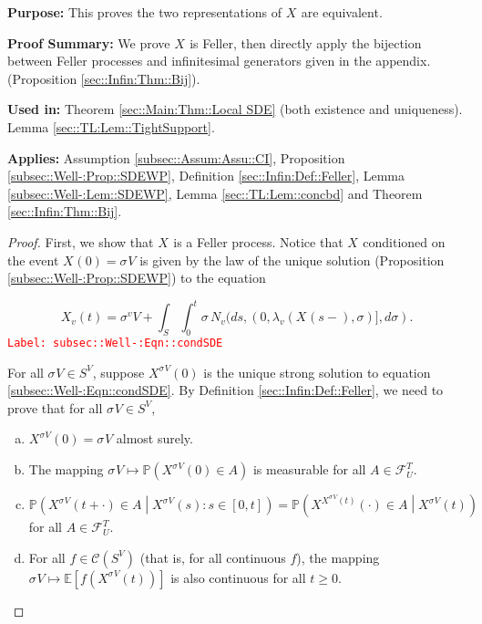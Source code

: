 \documentclass[12pt]{article}
\newcommand{\mb}{\mathbb}
\newcommand{\mc}{\mathcal}
\newcommand{\tr}{\textcolor{red}}
\newcommand{\labe}[1]{\tr{\texttt{Label: #1}}}
\newcommand{\purpose}{\textbf{Purpose: }}
\newcommand{\pfsum}{\textbf{Proof Summary: }}
\newcommand{\usein}{\textbf{Used in: }}
\newcommand{\app}{\textbf{Applies: }}
\newcommand{\pr}{\mb{P}}							%
\newcommand{\ex}[1]{\mb{E}\left[#1\right]}			%
\renewcommand{\v}{v}							%
\renewcommand{\U}{U}							%
\renewcommand{\S}{S}							%
\newcommand{\s}{\sigma}							%
\newcommand{\sv}[1]{\s^{#1}}					%
\newcommand{\T}{T}								%
\renewcommand{\t}{t}							%
\newcommand{\poiss}[1]{N_{#1}}						%
\newcommand{\V}{V}									%
\renewcommand{\tt}{s}								%
\newcommand{\XState}[1]{\S^{#1}}				%
\newcommand{\rxvt}[2]{X_{#1}{(#2)}}					%
\newcommand{\rxvtn}[3]{X_{#1}^{#3}(#2)}				%
\newcommand{\rxvts}[2]{X_{#1}{#2}}					%
\newcommand{\rate}[1]{\lambda_{#1}}					%
\newcommand{\F}[2]{\mc{F}_{#1}^{#2}}				%
\newcommand{\cont}{\mc{C}}							%
\begin{document}
\purpose This proves the two representations of \(\rxvts{}{}\) are equivalent.

\pfsum We prove \(\rxvts{}{}\) is Feller, then directly apply the bijection between Feller processes and infinitesimal generators given in the appendix. (Proposition \ref{sec::Infin:Thm::Bij}).

\usein Theorem \ref{sec::Main:Thm::Local SDE} (both existence and uniqueness). Lemma \ref{sec::TL:Lem::TightSupport}.

\app Assumption \ref{subsec::Assum:Assu::CI}, Proposition \ref{subsec::Well-:Prop::SDEWP}, Definition \ref{sec::Infin:Def::Feller}, Lemma \ref{subsec::Well-:Lem::SDEWP}, Lemma \ref{sec::TL:Lem::concbd} and Theorem \ref{sec::Infin:Thm::Bij}.

\begin{proof}
First, we show that \(\rxvts{}{}\) is a Feller process. Notice that \(\rxvts{}{}\) conditioned on the event \(\rxvt{}{0} = \sv{}{\V}\) is given by the law of the unique solution (Proposition \ref{subsec::Well-:Prop::SDEWP}) to the equation

\begin{equation}
\rxvt{\v}{\t} = \sv{\v}{\V} + \int_\S\int_0^\t \s\,\poiss{\v}(d\tt,(0,\rate{\v}(\rxvt{}{\tt-},\s)],d\s).
\label{subsec::Well-:Eqn::condSDE}
\end{equation}
\labe{subsec::Well-:Eqn::condSDE}

For all \(\sv{}{\V}\in\S^\V\), suppose \(\rxvtn{}{0}{\sv{}{\V}}\) is the unique strong solution to equation \eqref{subsec::Well-:Eqn::condSDE}. By Definition \ref{sec::Infin:Def::Feller}, we need to prove that for all \(\sv{}{\V}\in \S^\V\),

\begin{enumerate}[(a)]
\item \(\rxvtn{}{0}{\sv{}{\V}} = \sv{}{\V}\) almost surely.

\item The mapping \(\sv{}{\V}\mapsto \pr\left(\rxvtn{}{0}{\sv{}{\V}}\in A\right)\) is measurable for all \(A\in \F{\U}{\T}\).

\item \(\pr\left(\rxvtn{}{\t+\cdot}{\sv{}{\V}}\in A\middle|\rxvtn{}{\tt}{\sv{}{\V}}:\tt \in [0,\t]\right) = \pr\left(\rxvtn{}{\cdot}{\rxvtn{}{\t}{\sv{}{\V}}} \in A\middle| \rxvtn{}{\t}{\sv{}{\V}} \right)\) for all \(A \in \F{\U}{\T}\).

\item For all \(f \in \cont(\S^\V)\) (that is, for all continuous \(f\)), the mapping \(\sv{}{\V}\mapsto \ex{f(\rxvtn{}{\t}{\sv{}{\V}})}\) is also continuous for all \(t\geq 0\).
\end{enumerate}


\end{proof}
\end{document}
